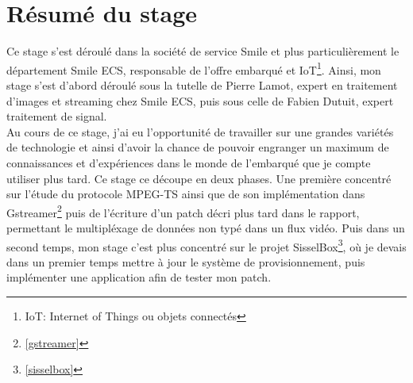 \chapter*{Résumé du stage}

Ce stage s'est déroulé dans la société de service Smile et plus particulièrement le département Smile ECS, responsable de l'offre embarqué et IoT\footnote{IoT: Internet of Things ou objets connectés}. Ainsi, mon stage s'est d'abord déroulé sous la tutelle de Pierre Lamot, expert en traitement d'images et streaming chez Smile ECS, puis sous celle de Fabien Dutuit, expert traitement de signal.
\\
Au cours de ce stage, j'ai eu l'opportunité de travailler sur une grandes variétés de technologie et ainsi d'avoir la chance de pouvoir engranger un maximum de connaissances et d'expériences dans le monde de l'embarqué que je compte utiliser plus tard.
\newline
\newline
Ce stage ce découpe en deux phases. Une première concentré sur l'étude du protocole MPEG-TS ainsi que de son implémentation dans Gstreamer\footnote{\ref{gstreamer}} puis de l'écriture d'un patch décri plus tard dans le rapport, permettant le multipléxage de données non typé dans un flux vidéo. Puis dans un second temps, mon stage c'est plus concentré sur le projet SisselBox\footnote{\ref{sisselbox}}, où je devais dans un premier temps mettre à jour le système de provisionnement, puis implémenter une application afin de tester mon patch.